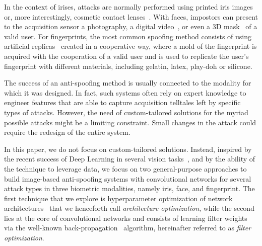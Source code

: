 

In the context of irises, attacks are normally performed using printed iris images~\cite{Sequeira:IJCB:2014} or, more interestingly, cosmetic contact lenses~\cite{Bowyer:Computer:2014,Yadav:TIFS:2014}.
With faces, impostors can present to the acquisition sensor a photography, a digital video~\cite{Chingovska:BIOSEG:2012}, or even a 3D mask~\cite{Erdogmus:BTAS:2013} of a valid user. 
%
%
For fingerprints, the most common spoofing method consists of using artificial replicas~\cite{Ghiani:ICB:2013} created in a cooperative way, where a mold of the fingerprint is acquired with the cooperation of a valid user and is used to replicate the user's fingerprint with different materials, including gelatin, latex, play-doh or silicone.

The success of an anti-spoofing method is usually connected to the modality for which it was designed. In fact, such systems often rely on expert knowledge to engineer features that are able to capture acquisition telltales left by specific types of attacks. However, the need of custom-tailored solutions for the myriad possible attacks might be a limiting constraint. Small changes in the attack could require the redesign of the entire system.

In this paper, we do not focus on custom-tailored solutions. Instead, inspired by the recent success of Deep Learning in several vision tasks~\cite{Ciresan:2010,Krizhevsky:2012,Ciresan:2012,Ouyang:2014,Taigman:2014}, and by the ability of the technique to leverage data, we focus on two general-purpose approaches to build image-based anti-spoofing systems with convolutional networks for several attack types in three biometric modalities, namely iris, face, and fingerprint. The first technique that we explore is hyperparameter optimization of network architectures~\cite{Pinto:2009,Bergstra:2012} that we henceforth call \emph{architecture optimization}, while the second lies at the core of convolutional networks and consists of learning filter weights via the well-known back-propagation~\cite{LeCun:1998} algorithm, hereinafter referred to as \emph{filter optimization}.

